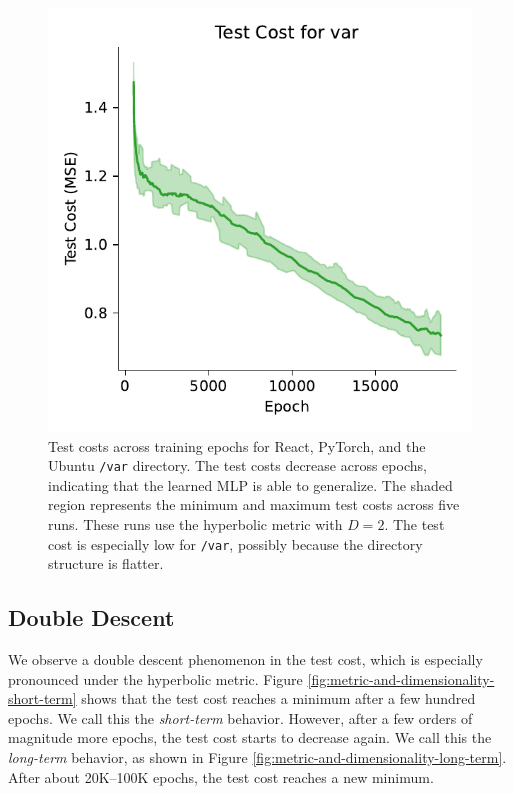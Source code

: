 \documentclass{article}
\begin{document}
\begin{figure}[H]
\begin{minipage}{0.33\textwidth}
  \end{minipage}%
  \begin{minipage}{0.33\textwidth}
    \centering
    \includegraphics[width=\linewidth]{figures/basic_test_cost_var.pdf}
  \end{minipage}
  \caption{Test costs across training epochs for React, PyTorch, and the Ubuntu \texttt{/var} directory. The test costs decrease across epochs, indicating that the learned MLP is able to generalize. The shaded region represents the minimum and maximum test costs across five runs. These runs use the hyperbolic metric with $D=2$. The test cost is especially low for \texttt{/var}, possibly because the directory structure is flatter.}
  \label{fig:basic-test-costs}
\end{figure}

\subsection{Double Descent}

We observe a double descent phenomenon in the test cost, which is especially pronounced under the hyperbolic metric. Figure \ref{fig:metric-and-dimensionality-short-term} shows that the test cost reaches a minimum after a few hundred epochs. We call this the \emph{short-term} behavior. However, after a few orders of magnitude more epochs, the test cost starts to decrease again. We call this the \emph{long-term} behavior, as shown in Figure \ref{fig:metric-and-dimensionality-long-term}. After about 20K--100K epochs, the test cost reaches a new minimum.
\end{document}
